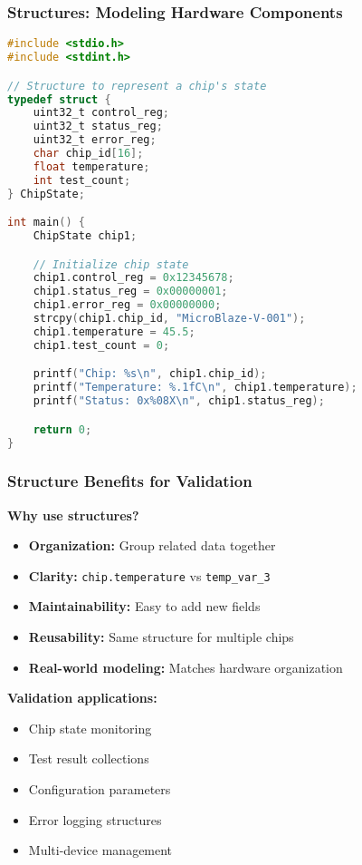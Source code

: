 \documentclass{beamer}
\begin{document}
\begin{frame}[fragile]
\frametitle{Structures: Modeling Hardware Components}
\begin{lstlisting}[language=C]
#include <stdio.h>
#include <stdint.h>

// Structure to represent a chip's state
typedef struct {
    uint32_t control_reg;
    uint32_t status_reg;
    uint32_t error_reg;
    char chip_id[16];
    float temperature;
    int test_count;
} ChipState;

int main() {
    ChipState chip1;

    // Initialize chip state
    chip1.control_reg = 0x12345678;
    chip1.status_reg = 0x00000001;
    chip1.error_reg = 0x00000000;
    strcpy(chip1.chip_id, "MicroBlaze-V-001");
    chip1.temperature = 45.5;
    chip1.test_count = 0;

    printf("Chip: %s\n", chip1.chip_id);
    printf("Temperature: %.1fC\n", chip1.temperature);
    printf("Status: 0x%08X\n", chip1.status_reg);

    return 0;
}
\end{lstlisting}
\end{frame}

\begin{frame}
\frametitle{Structure Benefits for Validation}
\textbf{Why use structures?}
\begin{itemize}
    \item \textbf{Organization:} Group related data together
    \item \textbf{Clarity:} \texttt{chip.temperature} vs \texttt{temp\_var\_3}
    \item \textbf{Maintainability:} Easy to add new fields
    \item \textbf{Reusability:} Same structure for multiple chips
    \item \textbf{Real-world modeling:} Matches hardware organization
\end{itemize}

\vspace{0.5cm}
\textbf{Validation applications:}
\begin{itemize}
    \item Chip state monitoring
    \item Test result collections
    \item Configuration parameters
    \item Error logging structures
    \item Multi-device management
\end{itemize}
\end{frame}
\end{document}
